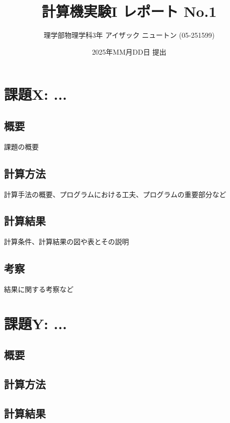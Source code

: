 \documentclass[uplatex,11pt]{jsarticle}
\begin{document}
\title{計算機実験I レポート No.1}
\author{理学部物理学科3年 アイザック ニュートン (05-251599)}
\date{2025年MM月DD日 提出}

\maketitle

\section{課題X: ...}
\subsection{概要}

課題の概要

\subsection{計算方法}

計算手法の概要、プログラムにおける工夫、プログラムの重要部分など

\subsection{計算結果}

計算条件、計算結果の図や表とその説明

\subsection{考察}

結果に関する考察など

\section{課題Y: ...}

\subsection{概要}

\subsection{計算方法}

\subsection{計算結果}
\end{document}
